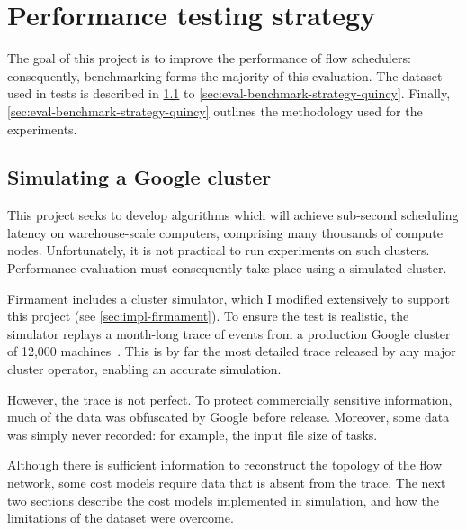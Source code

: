 \section{Performance testing strategy} \label{sec:eval-benchmark-strategy}

The goal of this project is to improve the performance of flow schedulers: consequently, benchmarking forms the majority of this evaluation. The dataset used in tests is described in \cref{sec:eval-benchmark-strategy-simulation} to \cref{sec:eval-benchmark-strategy-quincy}. Finally, \cref{sec:eval-benchmark-strategy-quincy} outlines the methodology used for the experiments.

\subsection{Simulating a Google cluster} \label{sec:eval-benchmark-strategy-simulation}

This project seeks to develop algorithms which will achieve sub-second scheduling latency on warehouse-scale computers, comprising many thousands of compute nodes. Unfortunately, it is not practical to run experiments on such clusters. Performance evaluation must consequently take place using a simulated cluster\footnotemark.

Firmament includes a cluster simulator, which I modified extensively to support this project (see \cref{sec:impl-firmament}). To ensure the test is realistic, the simulator replays a month-long trace of events from a production Google cluster of 12,000 machines~\cite{clusterdata:Wilkes2011,clusterdata:Reiss2011,Reiss:2012}. This is by far the most detailed trace released by any major cluster operator, enabling an accurate simulation.

However, the trace is not perfect. To protect commercially sensitive information, much of the data was obfuscated by Google before release. Moreover, some data was simply never recorded: for example, the input file size of tasks. 

Although there is sufficient information to reconstruct the topology of the flow network, some cost models require data that is absent from the trace. The next two sections describe the cost models implemented in simulation, and how the limitations of the dataset were overcome.

